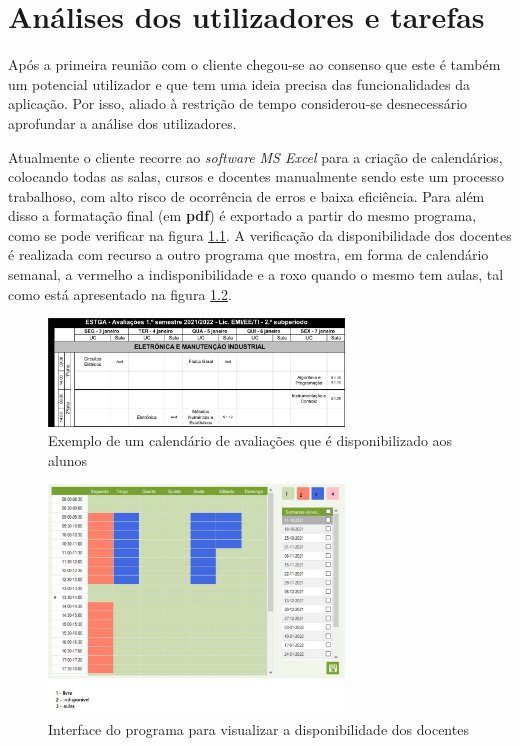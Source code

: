 \documentclass[11pt, twoside]{report}
\begin{document}
	
	
	\chapter{Análises dos utilizadores e tarefas}
	\label{analiseutilizador}
	
	Após a primeira reunião com o cliente chegou-se ao consenso que este é também um potencial utilizador e que tem uma ideia precisa das funcionalidades da aplicação.
	Por isso, aliado à restrição de tempo considerou-se desnecessário aprofundar a análise dos utilizadores. 
	
	Atualmente o cliente recorre ao \textit{software} \textit{MS Excel} para a criação de calendários,  colocando todas as salas, cursos e docentes manualmente sendo este um processo trabalhoso, com alto risco de ocorrência de erros e baixa eficiência.
	Para além disso a formatação final (em \textbf{pdf}) é exportado a partir do mesmo programa, como se pode verificar na figura \ref{calendarioatual}.
	A verificação da disponibilidade dos docentes é realizada com recurso a outro programa que mostra, em forma de calendário semanal, a vermelho a indisponibilidade e a roxo quando o mesmo tem aulas, tal como está apresentado na figura \ref{disponibilidadedocentes}. 
	
	\begin{figure}[H] 
		\centering 
		\includegraphics[width=0.7\textwidth,height=0.7\textheight,keepaspectratio]{image/calendarioavaliacao}
		\caption{Exemplo de um calendário de avaliações que é disponibilizado aos alunos}
		\label{calendarioatual}
	\end{figure}

	\begin{figure}[H] 
		\centering 
		\includegraphics[width=0.7\textwidth,height=0.7\textheight,keepaspectratio]{image/ColorMap}
		\caption{Interface do programa para visualizar a disponibilidade dos docentes}
		\label{disponibilidadedocentes}
	\end{figure}
	
\end{document}
